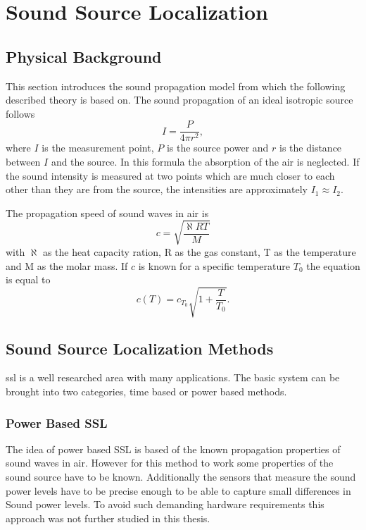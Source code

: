 \graphicspath{ {images/images/3_source_localization/} }
\chapter{Sound Source Localization}
\section{Physical Background}
This section introduces the sound propagation model from \cite{physik_skript} which the following described theory is based on.
The sound propagation of an ideal isotropic source follows
\begin{equation}
	I = \frac{P}{4\pi r^2},
\end{equation}
where $I$ is the measurement point, $P$ is the source power and $r$ is the distance
between $I$ and the source.
In this formula the absorption of the air is neglected.
If the sound intensity is measured at two points which are much closer
to each other than they are from the source, the intensities are approximately
$I_1 \approx I_2$.

The propagation speed of sound waves in air is
\begin{equation}
	c = \sqrt{\frac{\aleph R T}{M}}
\end{equation}
with $\aleph$ as the heat capacity ration, R as the gas constant, T as the temperature
and M as the molar mass.
If $c$ is known for a specific temperature $T_0$ the equation is equal to
\begin{equation}
	c(T) = c_{T_0} \sqrt{1 + \frac{T}{T_0}}.
\end{equation}


\section{Sound Source Localization Methods}
\acrfull{ssl} is a well researched area with many applications.
The basic system can be brought into two categories, time based or power based methods.
\subsection{Power Based SSL}
The idea of power based SSL is based of the known propagation properties of sound waves in air.
However for this method to work some properties of the sound source have to be known.
Additionally the sensors that measure the sound power levels have to be precise
enough to be able to capture small differences in Sound power levels.
To avoid such demanding hardware requirements this approach was not further
studied in this thesis.

